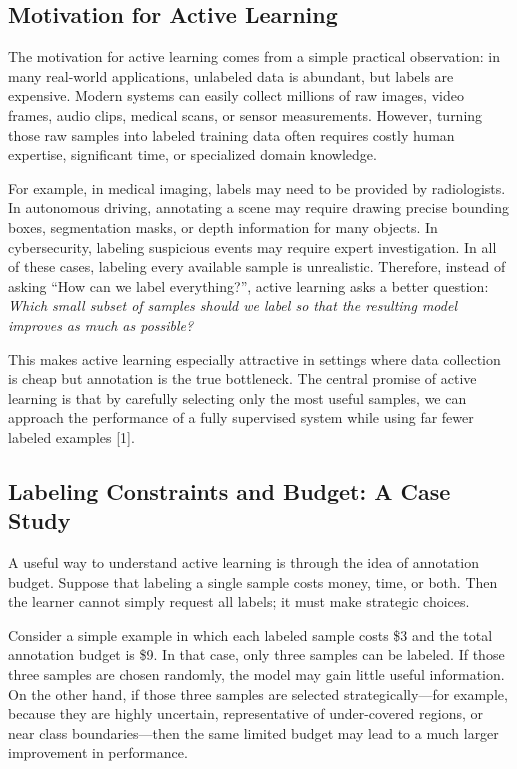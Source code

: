 \documentclass{article}
\renewcommand{\cite}[1]{[#1]}
\begin{document}
\subsection{Motivation for Active Learning}
The motivation for active learning comes from a simple practical observation: in many real-world applications, unlabeled data is abundant, but labels are expensive. Modern systems can easily collect millions of raw images, video frames, audio clips, medical scans, or sensor measurements. However, turning those raw samples into labeled training data often requires costly human expertise, significant time, or specialized domain knowledge.

For example, in medical imaging, labels may need to be provided by radiologists. In autonomous driving, annotating a scene may require drawing precise bounding boxes, segmentation masks, or depth information for many objects. In cybersecurity, labeling suspicious events may require expert investigation. In all of these cases, labeling every available sample is unrealistic. Therefore, instead of asking ``How can we label everything?'', active learning asks a better question: \emph{Which small subset of samples should we label so that the resulting model improves as much as possible?}

This makes active learning especially attractive in settings where data collection is cheap but annotation is the true bottleneck. The central promise of active learning is that by carefully selecting only the most useful samples, we can approach the performance of a fully supervised system while using far fewer labeled examples \cite{1}. 

\subsection{Labeling Constraints and Budget: A Case Study}
A useful way to understand active learning is through the idea of annotation budget. Suppose that labeling a single sample costs money, time, or both. Then the learner cannot simply request all labels; it must make strategic choices.

Consider a simple example in which each labeled sample costs \$3 and the total annotation budget is \$9. In that case, only three samples can be labeled. If those three samples are chosen randomly, the model may gain little useful information. On the other hand, if those three samples are selected strategically---for example, because they are highly uncertain, representative of under-covered regions, or near class boundaries---then the same limited budget may lead to a much larger improvement in performance.
\end{document}
